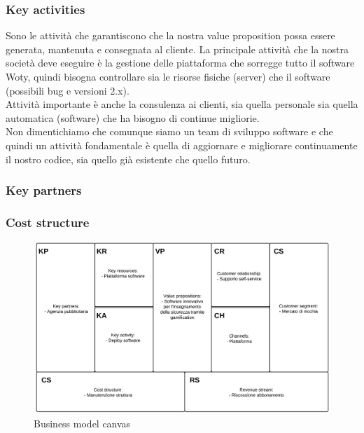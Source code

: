 \subsubsection{Key activities}
Sono le attività che garantiscono che la nostra value proposition possa essere generata, mantenuta e consegnata al cliente. La principale attività che la nostra società deve eseguire è la gestione delle piattaforma che sorregge tutto il software Woty, quindi bisogna controllare sia le risorse fisiche (server) che il software (possibili bug e versioni 2.x).\\
Attività importante è anche la consulenza ai clienti, sia quella personale sia quella automatica (software) che ha bisogno di continue migliorie.\\
Non dimentichiamo che comunque siamo un team di sviluppo software e che quindi un attività fondamentale è quella di aggiornare e migliorare continuamente il nostro codice, sia quello già esistente che quello futuro.

\subsubsection{Key partners} 
\subsubsection{Cost structure}

\begin{figure}[H]
\centering
\includegraphics[scale=0.8]{images/BM.png}
\caption{Business model canvas}
\end{figure}

